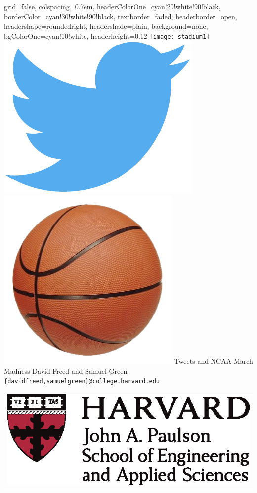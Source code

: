 \documentclass[landscape,a0paper,fontscale=0.292]{baposter}
\begin{document}
\begin{poster}{
 grid=false,
 colspacing=0.7em,
 headerColorOne=cyan!20!white!90!black,
 borderColor=cyan!30!white!90!black,
 textborder=faded,
 headerborder=open,
 headershape=roundedright,
 headershade=plain,
 background=none,
 bgColorOne=cyan!10!white,
 headerheight=0.12\textheight}
 {
      \texttt{[image: stadium1]}
      \includegraphics[width=0.10\linewidth]{twitter}
      \includegraphics[width=0.09\linewidth]{basketball}
 }
 {\sc\Huge Tweets and NCAA March Madness}
 {David Freed and Samuel Green\\[1em]
 {\texttt{\{davidfreed,samuelgreen\}@college.harvard.edu}}}
 {
  \begin{tabular}{r}
    \includegraphics[height=0.10\textheight]{images/SEASLogo_CMYK.eps}\\
  \end{tabular}
 }



\end{poster}
\end{document}
